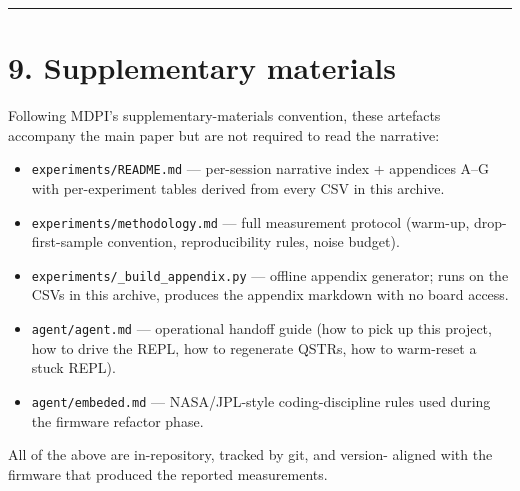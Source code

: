 \begin{center}\rule{0.5\linewidth}{0.5pt}\end{center}

\section{9. Supplementary materials}\label{supplementary-materials}

Following MDPI's supplementary-materials convention, these artefacts
accompany the main paper but are not required to read the narrative:

\begin{itemize}
\tightlist
\item
  \texttt{experiments/README.md} --- per-session narrative index +
  appendices A--G with per-experiment tables derived from every CSV in
  this archive.
\item
  \texttt{experiments/methodology.md} --- full measurement protocol
  (warm-up, drop-first-sample convention, reproducibility rules, noise
  budget).
\item
  \texttt{experiments/\_build\_appendix.py} --- offline appendix
  generator; runs on the CSVs in this archive, produces the appendix
  markdown with no board access.
\item
  \texttt{agent/agent.md} --- operational handoff guide (how to pick up
  this project, how to drive the REPL, how to regenerate QSTRs, how to
  warm-reset a stuck REPL).
\item
  \texttt{agent/embeded.md} --- NASA/JPL-style coding-discipline rules
  used during the firmware refactor phase.
\end{itemize}

All of the above are in-repository, tracked by git, and version- aligned
with the firmware that produced the reported measurements.
